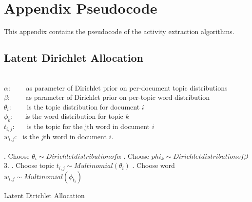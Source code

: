 
\chapter{Appendix Pseudocode}\label{ch:appendix}
This appendix contains the pseudocode of the activity extraction algorithms.
\renewcommand{\algorithmicrequire}{\textbf{Parameters:}}
\renewcommand{\algorithmicensure}{\textbf{Procedure:}}

\section{Latent Dirichlet Allocation}
\begin{algorithm}
\begin{algorithmic} 
\REQUIRE ~\\
\hspace{\algorithmicindent} $\alpha$: ~~~~as parameter of Dirichlet prior on per-document topic distributions\\ 
\hspace{\algorithmicindent}	$\beta$: ~~~~as parameter of Dirichlet prior on per-topic word distribution \\ 
\hspace{\algorithmicindent}	$\theta _i$:~~~~ is the topic distribution for document $i$ \\ 
\hspace{\algorithmicindent}	$\phi _k$: ~~~is the word distribution for topic $k$ \\
\hspace{\algorithmicindent}	$t_{i,j}$: ~~~is the topic for the jth word in document $i$\\
\hspace{\algorithmicindent}	$w_{i,j}$: ~is the $j$th word in document $i$.\\
\hrulefill
\ENSURE ~\\
	. Choose $\theta _i \sim Dirichlet distribution of \alpha$ 
	. Choose $phi _k  \sim Dirichlet distribution of \beta$ 
	3. 
		. Choose topic $t_{i,j} \sim Multinomial(\theta _i)$
		. Choose word $w_{i,j} \sim Multinomial(\phi _{t_i})$

	\ENDFOR 
\ENDFOR
\end{algorithmic}
\caption[Algorithm 1]{Latent Dirichlet Allocation}
\label{alg:lda}
\end{algorithm}


